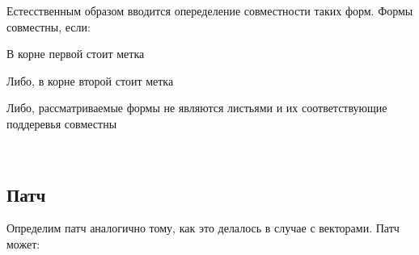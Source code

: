 Естесственным образом вводится опеределение совместности таких форм.
Формы совместны, если:

\begin{code}%
\>  \AgdaSymbol{:}      \<%
\end{code}

В корне первой стоит метка 

\begin{code}%
\>[0]\<[2]%
\>[2] \AgdaSymbol{:} \AgdaSymbol{(} \AgdaSymbol{:} \AgdaSymbol{)}    \<%
\end{code}

Либо, в корне второй стоит метка 

\begin{code}%
\>[0]\<[2]%
\>[2] \AgdaSymbol{:} \AgdaSymbol{(} \AgdaSymbol{:} \AgdaSymbol{)}    \<%
\end{code}

Либо, рассматриваемые формы не являются листьями и их соответствующие
поддеревья совместны

\begin{code}%
\>[0]\<[2]%
\>[2] \AgdaSymbol{:}  \AgdaSymbol{\{}    \AgdaSymbol{:} \AgdaSymbol{\}}         \<[56]%
\>[56]\<%
\\
\>[2]\<[4]%
\>[4]       \<%
\end{code}
    
\subsection{Патч}

Определим патч аналогично тому, как это делалось в случае с векторами.
Патч может:

